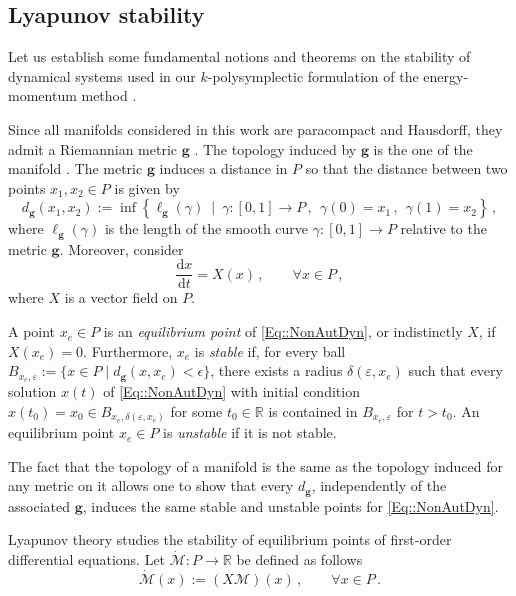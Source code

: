 \documentclass[11pt]{article}
\theoremstyle{plain}
\theoremstyle{definition}
\renewcommand{\d}{\mathrm{d}}
\def\d{\mathrm{d}}
\numberwithin{equation}{section}
\begin{document}
\subsection{Lyapunov stability}\label{Sec::Stab}

Let us establish some fundamental notions and theorems on the stability of dynamical systems used in our $k$-polysymplectic formulation of the energy-momentum method \cite{LZ_21, Zaw_21}.

Since all manifolds considered in this work are paracompact and Hausdorff, they admit a Riemannian metric $\mathbf{g}$ \cite{Lee_09}. The topology induced by $\mathbf{g}$ is the one of the manifold \cite{Lee_09,Lee_12, Zaw_21}. The metric $\mathbf{g}$ induces a distance in $P$ so that the distance between two points $x_1,x_2\in P$ is given by 
\begin{equation}
    d_{\mathbf{g}}(x_1,x_2):=\inf\left\{\ell_{\mathbf{g}}(\gamma) \ \mid\ \gamma:[0,1]\rightarrow P\,,\ \ \gamma(0)=x_1\,,\ \ \gamma(1)=x_2\right\}\,,
\end{equation}
where $\ell_{\mathbf{g}}(\gamma)$ is the length of the smooth curve $\gamma:[0,1]\rightarrow  P$ relative to the metric $\mathbf{g}$. Moreover, consider 
\begin{equation}\label{Eq::NonAutDyn}
     \frac{\d x}{\d t} = X(x)\,,\qquad \forall x\in P\,,
\end{equation}
where $X$ is a vector field on $P$.

A point $x_e\in P$ is an {\it equilibrium point} of \eqref{Eq::NonAutDyn}, or indistinctly $X$, if $X(x_e)=0$. Furthermore, $x_e$ is {\it stable} if, for every ball $B_{x_e,\varepsilon}:=\{x\in P\mid d_{\mathbf{g}}(x,x_e)<\epsilon\}$, there exists a radius $\delta(\varepsilon,x_e)$ such that every solution $x(t)$ of \eqref{Eq::NonAutDyn} with initial condition $x(t_0)=x_0\in B_{x_e,\delta(\varepsilon,x_e)}$ for some $t_0\in \mathbb{R}$ is contained in $B_{x_e,\varepsilon}$ for $t>t_0$. An equilibrium point $x_e\in P$ is {\it unstable} if it is not stable. 

The fact that the topology of a manifold is the same as the topology induced for any metric on it allows one to show that every $d_{\mathbf{g}}$, independently of the associated $\mathbf{g}$, induces the same stable and unstable points for \eqref{Eq::NonAutDyn}.

Lyapunov theory studies the stability of equilibrium points of first-order differential equations. Let $\dot{\mathcal{M}}:P\rightarrow \mathbb{R}$ be defined as follows
\[
\dot{\mathcal{M}}(x):=(X\mathcal{M})(x)\,,%
\qquad \forall x\in P\,.
\]
\end{document}
